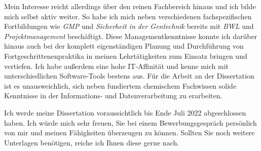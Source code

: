 Mein Interesse reicht allerdings über den reinen Fachbereich hinaus und ich bilde mich selbst aktiv weiter. So habe ich mich neben verschiedenen fachspezifischen Fortbildungen wie \emph{GMP} und \emph{Sicherheit in der Gentechnik} bereits mit \emph{BWL} und \emph{Projektmanagement} beschäftigt. Diese Managementkenntnisse konnte ich darüber hinaus auch bei der komplett eigenständigen Planung und Durchführung von Fortgeschrittenenpraktika in meinen Lehrtätigkeiten zum Einsatz bringen und vertiefen. Ich habe außerdem eine hohe IT-Affinität und kenne mich mit unterschiedlichen Software-Tools bestens aus. Für die Arbeit an der Dissertation ist es unausweichlich, sich neben fundiertem chemischem Fachwissen solide Kenntnisse in der Informations- und Datenverarbeitung zu erarbeiten.\par

Ich werde meine Dissertation voraussichtlich bis Ende Juli 2022 abgeschlossen haben. Ich würde mich sehr freuen, Sie bei einem Bewerbungsgespräch persönlich von mir und meinen Fähigkeiten überzeugen zu können. Sollten Sie noch weitere Unterlagen benötigen, reiche ich Ihnen diese gerne nach.\par\vspace{1em}



\makeletterclosing


